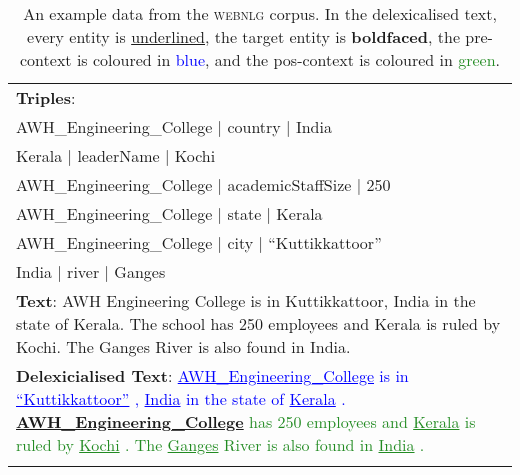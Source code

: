 \begin{table*}[t!]
\small
\centering
\begin{tabular}{p{15cm}}
\lsptoprule
\textbf{Triples}: \\
AWH\_Engineering\_College | country | India \\
Kerala | leaderName | Kochi \\
AWH\_Engineering\_College | academicStaffSize | 250 \\
AWH\_Engineering\_College | state | Kerala \\
AWH\_Engineering\_College | city | ``Kuttikkattoor'' \\
India | river | Ganges \\
\midrule
\textbf{Text}: AWH Engineering College is in Kuttikkattoor, India in the state of Kerala. The school has 250 employees and Kerala is ruled by Kochi. The Ganges River is also found in India. \\
\textbf{Delexicialised Text}: \textcolor{blue}{\underline{AWH\_Engineering\_College} is in \underline{``Kuttikkattoor''} , \underline{India} in the state of \underline{Kerala} . }\textbf{\underline{AWH\_Engineering\_College}} \textcolor{ForestGreen}{has 250 employees and \underline{Kerala} is ruled by \underline{Kochi} . The \underline{Ganges} River is also found in \underline{India} .}\\
\lspbottomrule
\end{tabular}
\caption{An example data from the \textsc{webnlg} corpus. In the delexicalised text, every entity is \underline{underlined}, the target entity is \textbf{boldfaced}, the pre-context is coloured in \textcolor{blue}{blue}, and the pos-context is coloured in \textcolor{ForestGreen}{green}.}
\label{tab:sample}
\end{table*}
